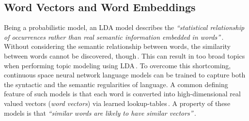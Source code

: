 \subsection{Word Vectors and Word Embeddings}
\label{sub:back_word_embeddings}
Being a probabilistic model, an LDA model describes the \textit{``statistical relationship of occurrences rather than real semantic information embedded in words''}\,\cite{niu_topic2vec_2015}. Without considering the semantic relationship between words, the similarity between words cannot be discovered, though\,\cite{mikolov_efficient_2013}. This can result in too broad topics when performing topic modeling using LDA\,\cite{niu_topic2vec_2015}. To overcome this shortcoming, continuous space neural network language models can be trained to capture both the syntactic and the semantic regularities of language. A common defining feature of such models is that each word is converted into high-dimensional real valued vectors (\textit{word vectors}) via learned lookup-tables\,\cite{mikolov_linguistic_2013}. A property of these models is that \textit{``similar words are likely to have similar vectors''}\,\cite{mikolov_linguistic_2013}. 



